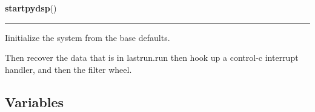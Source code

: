     \label{pydsp:startpydsp}

    \vspace{0.5ex}

    \begin{boxedminipage}{\textwidth}

    \raggedright \textbf{startpydsp}()

    \vspace{-1.5ex}

    \rule{\textwidth}{0.5\fboxrule}
    Iinitialize the system from the base defaults.

    Then recover the data that is in lastrun.run then hook up a control-c 
    interrupt handler, and then the filter wheel.

    \vspace{1ex}

    \end{boxedminipage}



  \subsection{Variables}

